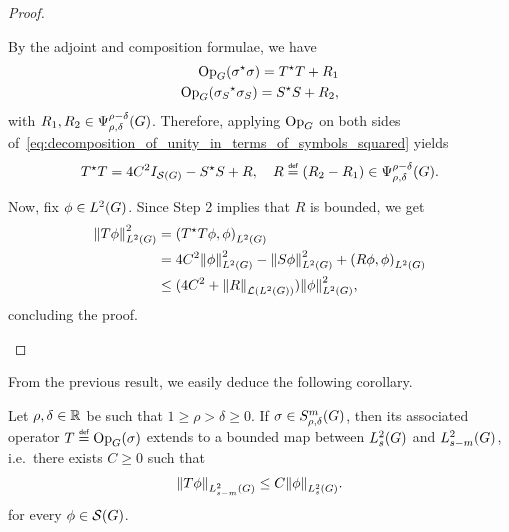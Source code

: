 \begin{proof}
\begin{description}
            By the adjoint and composition formulae,
            we have
            \begin{align*}
                \Op(\adj \sigma \sigma) = \adj T T + R_1\\
                \Op(\adj {\sigma_S} \sigma_S) = \adj S S +  R_2,
            \end{align*}
            with $R_1, R_2 \in \OperatorClass {\rho - \delta} {\rho, \delta}$.
            Therefore, applying $\Op$ on both sides of~\eqref{eq:decomposition_of_unity_in_terms_of_symbols_squared} yields
            \begin{align*}
                \adj T T = 4 C^2 \Id {\Schwartz \Group} - \adj S S + R,
                \quad R \defeq (R_2 - R_1) \in \OperatorClass {\rho - \delta} {\rho, \delta}.
            \end{align*}

            Now, fix $\phi \in \Lebesgue 2 \Group$.
            Since Step 2 implies that $R$ is bounded,
            we get
            \begin{align*}
                \norm [\Lebesgue 2 \Group] {T \phi}^2
                &= \ip [\Lebesgue 2 \Group] {\adj T T \phi} \phi\\
                &= 4 C^2 \norm [\Lebesgue 2 \Group] \phi^2 - \norm [\Lebesgue 2 \Group] {S \phi}^2 + \ip [\Lebesgue 2 \Group] {R \phi} {\phi}\\
                &\leq (4 C^2 + \norm [\Lin {\Lebesgue 2 \Group}] R) \norm [\Lebesgue 2 \Group] \phi^2,
            \end{align*}
            concluding the proof.
    \end{description}
\end{proof}

From the previous result,
we easily deduce the following corollary.

\begin{theorem}
\label{theorem:L2_boundedness}
    Let $\rho, \delta \in \R$ be such that $1 \geq \rho > \delta \geq 0$.
    If $\sigma \in \SymbolClass m {\rho, \delta}$,
    then its associated operator $T \defeq \Op(\sigma)$ extends to a bounded map
    between $\Sobolev s$ and $\Sobolev {s - m}$,
    i.e.\ there exists $C \geq 0$ such that
    \begin{align*}
        \norm [\Sobolev {s - m}] {T \phi} \leq C \norm [\Sobolev s] \phi.
    \end{align*}
    for every $\phi \in \Schwartz \Group$.
\end{theorem}

